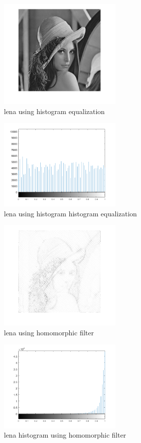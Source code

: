 \documentclass[conference]{IEEEtran}
\begin{document}
\begin{figure}[H]
\centerline{\includegraphics[width=6cm]{lena_histeq.png}}
\caption{lena using histogram equalization}
\label{lena_histeq}
\end{figure}


\begin{figure}[H]
\centerline{\includegraphics[width=6cm]{lena_histeq_hist.png}}
\caption{lena using histogram histogram equalization}
\label{lena_histeq_hist}
\end{figure}

\begin{figure}[H]
\centerline{\includegraphics[width=6cm]{lena_homo.png}}
\caption{lena using homomorphic filter}
\label{lena_homo}
\end{figure}


\begin{figure}[H]
\centerline{\includegraphics[width=6cm]{lena_homo_hist.png}}
\caption{lena histogram using homomorphic filter}
\label{lena_homo_hist}
\end{figure}
\end{document}
